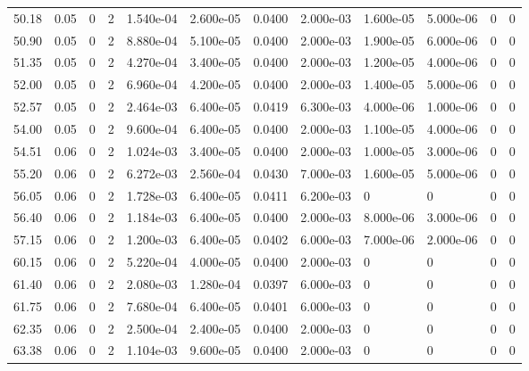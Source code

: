 \documentclass[preview]{standalone}
\begin{document}
{{{\begin{tabular}{L{1.2cm}C{1.2cm} C{0.3cm}C{0.5cm} C{1.4cm}C{1.4cm} C{1.4cm}C{1.4cm} C{1.6cm}C{1.6cm} C{1.6cm}C{1.6cm}}
  50.18  &  0.05  & 0     &  2 &  1.540e-04  & 2.600e-05  &  0.0400&   2.000e-03& 1.600e-05 & 5.000e-06   &  0 & 0  \\ 
  50.90  &  0.05  & 0     &  2 &  8.880e-04  & 5.100e-05  &  0.0400&   2.000e-03& 1.900e-05 & 6.000e-06   &  0 & 0  \\ 
  51.35  &  0.05  & 0     &  2 &  4.270e-04  & 3.400e-05  &  0.0400&   2.000e-03& 1.200e-05 & 4.000e-06   &  0 & 0  \\ 
  52.00  &  0.05  & 0     &  2 &  6.960e-04  & 4.200e-05  &  0.0400&   2.000e-03& 1.400e-05 & 5.000e-06   &  0 & 0  \\ 
  52.57  &  0.05  & 0     &  2 &  2.464e-03  & 6.400e-05  &  0.0419&   6.300e-03& 4.000e-06 & 1.000e-06   &  0 & 0  \\ 
  54.00  &  0.05  & 0     &  2 &  9.600e-04  & 6.400e-05  &  0.0400&   2.000e-03& 1.100e-05 & 4.000e-06   &  0 & 0  \\ 
  54.51  &  0.06  & 0     &  2 &  1.024e-03  & 3.400e-05  &  0.0400&   2.000e-03& 1.000e-05 & 3.000e-06   &  0 & 0  \\ 
  55.20  &  0.06  & 0     &  2 &  6.272e-03  & 2.560e-04  &  0.0430&   7.000e-03& 1.600e-05 & 5.000e-06   &  0 & 0  \\ 
  56.05  &  0.06  & 0     &  2 &  1.728e-03  & 6.400e-05  &  0.0411&   6.200e-03& 0 & 0   &  0 & 0  \\ 
  56.40  &  0.06  & 0     &  2 &  1.184e-03  & 6.400e-05  &  0.0400&   2.000e-03& 8.000e-06 & 3.000e-06   &  0 & 0  \\ 
  57.15  &  0.06  & 0     &  2 &  1.200e-03  & 6.400e-05  &  0.0402&   6.000e-03& 7.000e-06 & 2.000e-06   &  0 & 0  \\ 
  60.15  &  0.06  & 0     &  2 &  5.220e-04  & 4.000e-05  &  0.0400&   2.000e-03& 0 & 0   &  0 & 0  \\ 
  61.40  &  0.06  & 0     &  2 &  2.080e-03  & 1.280e-04  &  0.0397&   6.000e-03& 0 & 0   &  0 & 0  \\ 
  61.75  &  0.06  & 0     &  2 &  7.680e-04  & 6.400e-05  &  0.0401&   6.000e-03& 0 & 0   &  0 & 0  \\ 
  62.35  &  0.06  & 0     &  2 &  2.500e-04  & 2.400e-05  &  0.0400&   2.000e-03& 0 & 0   &  0 & 0  \\ 
  63.38  &  0.06  & 0     &  2 &  1.104e-03  & 9.600e-05  &  0.0400&   2.000e-03& 0 & 0   &  0 & 0  \\ 
\hline 
\end{tabular} 

}}}
\end{document}
